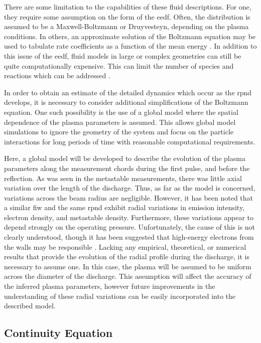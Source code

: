 There are some limitation to the capabilities of these fluid descriptions. For
one, they require some assumption on the form of the \acs{eedf}. Often, the
distribution is assumed to be a Maxwell-Boltzmann or Druyvesteyn, depending on
the plasma conditions. In others, an approximate solution of the Boltzmann
equation may be used to tabulate rate coefficients as a function of the mean
energy \cite{Hagelaar2005}. In addition to this issue of the \acs{eedf}, fluid
models in large or complex geometries can still be quite computationally
expensive. This can limit the number of species and reactions which can be
addressed \cite{Lieberman2005}.

In order to obtain an estimate of the detailed dynamics which occur as the
\acs{rpnd} develops, it is necessary to consider additional simplifications of
the Boltzmann equation. One such possibility is the use of a global model where
the spatial dependence of the plasma parameters is assumed. This allows global
model simulations to ignore the geometry of the system and focus on the particle
interactions for long periods of time with reasonable computational
requirements.

Here, a global model will be developed to describe the evolution of the plasma
parameters along the measurement chords during the first pulse, and before the
reflection. As was seen in the metastable measurements, there was little axial
variation over the length of the discharge. Thus, as far as the model is
concerned, variations across the beam radius are negligible. However, it has
been noted that a similar \acs{fiw} \cite{Vasilyak1994} and the same \acs{rpnd}
\cite{Weatherford2012} exhibit radial variations in emission intensity, electron
density, and metastable density. Furthermore, these variations appear to depend
strongly on the operating pressure. Unfortunately, the cause of this is not
clearly understood, though it has been suggested that high-energy electrons from
the walls may be responsible \cite{Weatherford2012a}. Lacking any empirical,
theoretical, or numerical results that provide the evolution of the radial
profile during the discharge, it is necessary to assume one. In this case, the
plasma will be assumed to be uniform across the diameter of the discharge. This
assumption will affect the accuracy of the inferred plasma parameters, however
future improvements in the understanding of these radial variations can be
easily incorporated into the described model.

\subsection{Continuity Equation}

